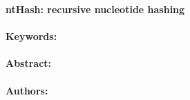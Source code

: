 \noindent
\large {\bf ntHash: recursive nucleotide hashing} 


\normalsize 


\noindent \paragraph{Keywords:} 

\noindent \paragraph{Abstract:} 



\noindent \paragraph{Authors:} 

